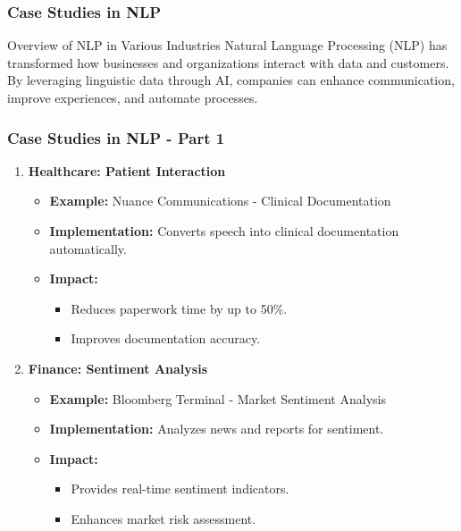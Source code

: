 \documentclass[aspectratio=169]{beamer}
\begin{document}
\begin{frame}
    \frametitle{Case Studies in NLP}
    \begin{block}{Overview of NLP in Various Industries}
        Natural Language Processing (NLP) has transformed how businesses and organizations interact with data and customers. By leveraging linguistic data through AI, companies can enhance communication, improve experiences, and automate processes.
    \end{block}
\end{frame}

\begin{frame}
    \frametitle{Case Studies in NLP - Part 1}
    \begin{enumerate}
        \item \textbf{Healthcare: Patient Interaction}
        \begin{itemize}
            \item \textbf{Example:} Nuance Communications - Clinical Documentation
            \item \textbf{Implementation:} Converts speech into clinical documentation automatically.
            \item \textbf{Impact:}
            \begin{itemize}
                \item Reduces paperwork time by up to 50\%.
                \item Improves documentation accuracy.
            \end{itemize}
        \end{itemize}
        
        \item \textbf{Finance: Sentiment Analysis}
        \begin{itemize}
            \item \textbf{Example:} Bloomberg Terminal - Market Sentiment Analysis
            \item \textbf{Implementation:} Analyzes news and reports for sentiment.
            \item \textbf{Impact:}
            \begin{itemize}
                \item Provides real-time sentiment indicators.
                \item Enhances market risk assessment.
            \end{itemize}
        \end{itemize}
    \end{enumerate}
\end{frame}
\end{document}
